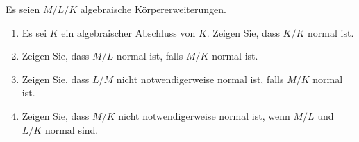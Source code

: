 \begin{question}[subtitle = Einschränkung und Transitivität von Normalität]
  \label{question: restriction and transitivity of normality}
  Es seien $M/L/K$ algebraische Körpererweiterungen.
  \begin{enumerate}
    \item
      Es sei $\overline{K}$ ein algebraischer Abschluss von $K$.
      Zeigen Sie, dass $\overline{K}/K$ normal ist.
    \item
      Zeigen Sie, dass $M/L$ normal ist, falls $M/K$ normal ist.
    \item
      Zeigen Sie, dass $L/M$ nicht notwendigerweise normal ist, falls $M/K$ normal ist.
    \item
      Zeigen Sie, dass $M/K$ nicht notwendigerweise normal ist, wenn $M/L$ und $L/K$ normal sind.
  \end{enumerate}
\end{question}


